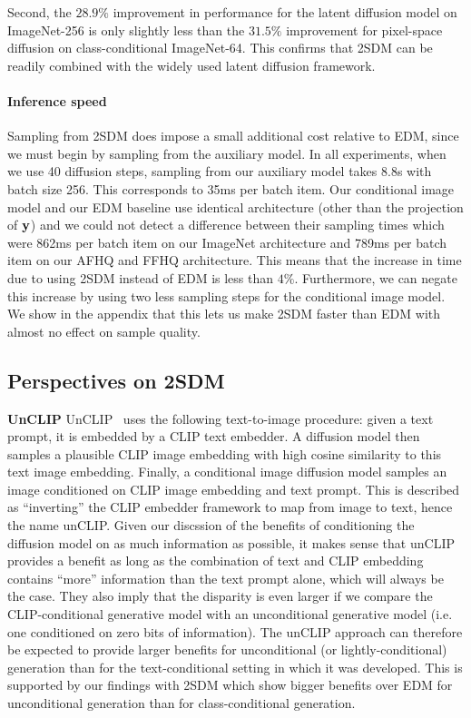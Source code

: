 Second, the $28.9\%$ improvement in performance for the latent diffusion model on ImageNet-256 is only slightly less than the $31.5\%$ improvement for pixel-space diffusion on class-conditional ImageNet-64. This confirms that 2SDM can be readily combined with the widely used latent diffusion framework.

\paragraph{Inference speed}
Sampling from 2SDM does impose a small additional cost relative to EDM, since we must begin by sampling from the auxiliary model. In all experiments, when we use 40 diffusion steps, sampling from our auxiliary model takes 8.8s with batch size 256. This corresponds to 35ms per batch item. Our conditional image model and our EDM baseline use identical architecture (other than the projection of ${\mathbf{y}}$) and we could not detect a difference between their sampling times which were 862ms per batch item on our ImageNet architecture and 789ms per batch item on our AFHQ and FFHQ architecture. This means that the increase in time due to using 2SDM instead of EDM is less than $4\%$. Furthermore, we can negate this increase by using two less sampling steps for the conditional image model. We show in the appendix that this lets us make 2SDM faster than EDM with almost no effect on sample quality.


\subsection{Perspectives on 2SDM}
\textbf{UnCLIP} \label{sec:unclip}
UnCLIP~\citep{ramesh2022hierarchical} uses the following text-to-image procedure: given a text prompt, it is embedded by a CLIP text embedder. A diffusion model then samples a plausible CLIP image embedding with high cosine similarity to this text image embedding. Finally, a conditional image diffusion model samples an image conditioned on CLIP image embedding and text prompt. This is described as ``inverting'' the CLIP embedder framework to map from image to text, hence the name unCLIP. Given our discssion of the benefits of conditioning the diffusion model on as much information as possible, it makes sense that unCLIP provides a benefit as long as the combination of text and CLIP embedding contains ``more'' information than the text prompt alone, which will always be the case. They also imply that the disparity is even larger if we compare the CLIP-conditional generative model with an unconditional generative model  (i.e. one conditioned on zero bits of information). The unCLIP approach can therefore be expected to provide larger benefits for unconditional (or lightly-conditional) generation than for the text-conditional setting in which it was developed. This is supported by our findings with 2SDM which show bigger benefits over EDM for unconditional generation than for class-conditional generation.

